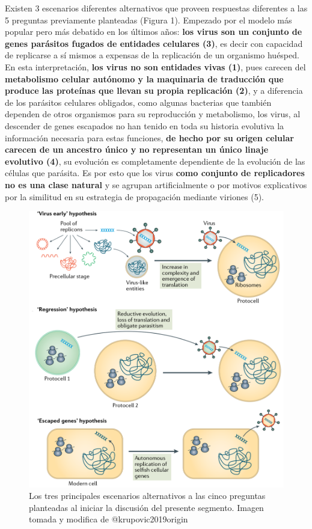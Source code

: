 \documentclass[
  12pt, krantz2,
  spanish,
]{krantz}
\begin{document}
Existen 3 escenarios diferentes alternativos que proveen respuestas diferentes a las 5 preguntas previamente planteadas (Figura 1). Empezado por el modelo más popular pero más debatido en los últimos años: \textbf{los virus son un conjunto de genes parásitos fugados de entidades celulares (3)}, es decir con capacidad de replicarse a sí mismos a expensas de la replicación de un organismo huésped. En esta interpretación, \textbf{los virus no son entidades vivas (1)}, pues carecen del \textbf{metabolismo celular autónomo y la maquinaria de traducción que produce las proteínas que llevan su propia replicación (2)}, y a diferencia de los parásitos celulares obligados, como algunas bacterias que también dependen de otros organismos para su reproducción y metabolismo, los virus, al descender de genes escapados no han tenido en toda su historia evolutiva la información necesaria para estas funciones, \textbf{de hecho por su origen celular carecen de un ancestro único y no representan un único linaje evolutivo (4)}, su evolución es completamente dependiente de la evolución de las células que parásita. Es por esto que los virus \textbf{como conjunto de replicadores no es una clase natural} y se agrupan artificialmente o por motivos explicativos por la similitud en su estrategia de propagación mediante viriones (5).

\begin{figure}
\includegraphics[width=0.8\linewidth]{figures/threeHypo} \caption{Los tres principales escenarios alternativos a las cinco preguntas planteadas al iniciar la discusión del presente segmento. Imagen tomada y modifica de @krupovic2019origin}\label{fig:threehypo}
\end{figure}
\end{document}
